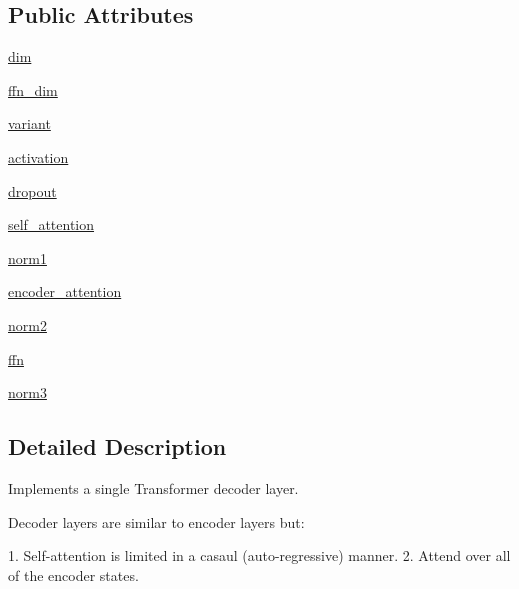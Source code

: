 \subsection*{Public Attributes}
\begin{DoxyCompactItemize}
\item 
\hyperlink{classparlai_1_1agents_1_1transformer_1_1modules_1_1TransformerDecoderLayer_afc3159ec4e88329e2967edf28923ea20}{dim}
\item 
\hyperlink{classparlai_1_1agents_1_1transformer_1_1modules_1_1TransformerDecoderLayer_a296aa88e8a31be628bb31f55de0a0360}{ffn\+\_\+dim}
\item 
\hyperlink{classparlai_1_1agents_1_1transformer_1_1modules_1_1TransformerDecoderLayer_a94a9a714a2585fd6a675a08643e3ce6b}{variant}
\item 
\hyperlink{classparlai_1_1agents_1_1transformer_1_1modules_1_1TransformerDecoderLayer_a33276633e128020853db98128f1d93c3}{activation}
\item 
\hyperlink{classparlai_1_1agents_1_1transformer_1_1modules_1_1TransformerDecoderLayer_aba87c66e402b0cfdf196872c3f038d43}{dropout}
\item 
\hyperlink{classparlai_1_1agents_1_1transformer_1_1modules_1_1TransformerDecoderLayer_ad656c203b5b2ab890ea419febace286f}{self\+\_\+attention}
\item 
\hyperlink{classparlai_1_1agents_1_1transformer_1_1modules_1_1TransformerDecoderLayer_aa82d4bae763a0867633b6d5bc8484129}{norm1}
\item 
\hyperlink{classparlai_1_1agents_1_1transformer_1_1modules_1_1TransformerDecoderLayer_a50be54030dc6526fd5cae1f48a448f04}{encoder\+\_\+attention}
\item 
\hyperlink{classparlai_1_1agents_1_1transformer_1_1modules_1_1TransformerDecoderLayer_ac581c47d531c120ca010ce5fa3836b24}{norm2}
\item 
\hyperlink{classparlai_1_1agents_1_1transformer_1_1modules_1_1TransformerDecoderLayer_a394248deb2cfa738a51f890d4c232224}{ffn}
\item 
\hyperlink{classparlai_1_1agents_1_1transformer_1_1modules_1_1TransformerDecoderLayer_a24e685c1a13c11ce7bd4a839bc93ab2a}{norm3}
\end{DoxyCompactItemize}


\subsection{Detailed Description}
\begin{DoxyVerb}Implements a single Transformer decoder layer.

Decoder layers are similar to encoder layers but:

1. Self-attention is limited in a casaul (auto-regressive) manner.
2. Attend over all of the encoder states.
\end{DoxyVerb}
 

